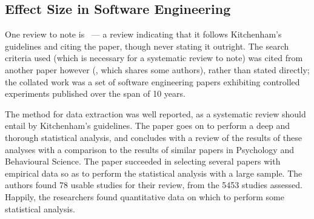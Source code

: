 \subsection{Effect Size in Software Engineering}
One review to note is~\citet*{Kampenes2007} --- a review indicating that it follows Kitchenham's guidelines and citing the paper, though never stating it outright. The search criteria used (which is necessary for a systematic review to note) was cited from another paper however (\cite{Sjoberg2005}, which shares some authors), rather than stated directly; the collated work was a set of software engineering papers exhibiting controlled experiments published over the span of 10 years.\par

The method for data extraction was well reported, as a systematic review should entail by Kitchenham's guidelines. The paper goes on to perform a deep and thorough statistical analysis, and concludes with a review of the results of these analyses with a comparison to the results of similar papers in Psychology and Behavioural Science. The paper succeeded in selecting several papers with empirical data so as to perform the statistical analysis with a large sample. The authors found 78 usable studies for their review, from the 5453 studies assessed. Happily, the researchers found quantitative data on which to perform some statistical analysis.\par

